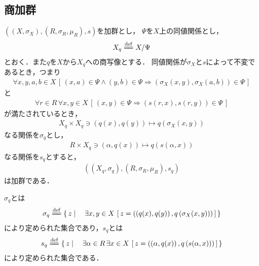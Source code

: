 \subsection{商加群}
	
	\begin{screen}
		\begin{thm}[商加群]\label{thm:quotient_module}
			$\left(\left(X,\sigma_X\right),\left(R,\sigma_R,\mu_R\right),s\right)$を加群とし，
			$\Psi$を$X$上の同値関係とし，
			\begin{align}
				X_q \defeq X/\Psi
			\end{align}
			とおく．また$q$を$X$から$X_q$への商写像とする．
			同値関係が$\sigma_X$と$s$によって不変であるとき，つまり
			\begin{align}
				\forall x,y,a,b \in X\,
				\left[\, (x,a) \in \Psi \wedge (y,b) \in \Psi \Longrightarrow 
				\left(\sigma_X(x,y), \sigma_X(a,b)\right) \in \Psi\, \right]
				\label{fom:thm_quotient_module_1}
			\end{align}
			と
			\begin{align}
				\forall r \in R\, \forall x,y \in X\,
				\left[\, (x,y) \in \Psi \Longrightarrow 
				\left(s(r,x), s(r,y)\right) \in \Psi\, \right]
				\label{fom:thm_quotient_module_2}
			\end{align}
			が満たされているとき，
			\begin{align}
				X_q \times X_q \ni \left(q(x),q(y)\right) \longmapsto q\left(\sigma_X(x,y)\right)
			\end{align}
			なる関係を$\sigma_q$とし，
			\begin{align}
				R \times X_q \ni \left(\alpha,q(x)\right) \longmapsto q\left(s(\alpha,x)\right)
			\end{align}
			なる関係を$s_q$とすると，
			\begin{align}
				\left(\left(X_q,\sigma_q\right),\left(R,\sigma_R,\mu_R\right),s_q\right)
			\end{align}
			は加群である．
		\end{thm}
	\end{screen}
	
	$\sigma_q$とは
	\begin{align}
		\sigma_q \defeq \Set{z}{\exists x,y \in X\, 
		\left[\, z=\left(\left(q(x),q(y)\right),q\left(\sigma_X(x,y)\right)\right)\, \right]}
	\end{align}
	により定められた集合であり，$s_q$とは
	\begin{align}
		s_q \defeq \Set{z}{\exists \alpha \in R\, \exists x \in X\, 
		\left[\, z=\left(\left(\alpha,q(x)\right),q\left(s(\alpha,x)\right)\right)\, \right]}
	\end{align}
	により定められた集合である．
	
